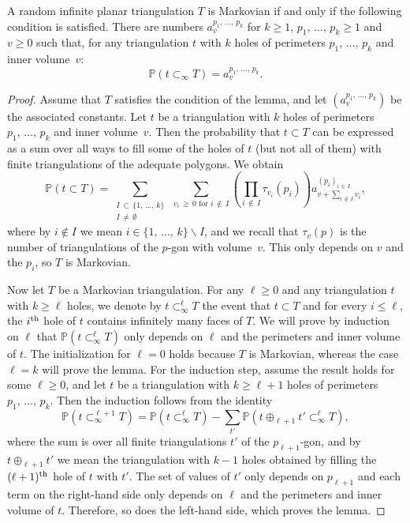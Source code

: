 \documentclass[AHL,Unicode,longabstracts,published]{cedram}
\renewcommand{\P}{\mathbb{P}}
\begin{document}
\begin{lemm}\label{lem_equivalence_weak_Markov}
A random infinite planar triangulation $T$ is Markovian if and only if the following condition is satisfied. There are numbers $a^{p_1,\,\dots,\, p_k}_v$ for $k \geq 1$, $p_1,\,\dots,\,p_k \geq 1$ and $v \geq 0$ such that, for any triangulation $t$ with $k$ holes of perimeters $p_1,\,\dots,\, p_k$ and inner volume~$v$:
\[
\P \left(t \subset_{\infty} T \right) = a^{p_1,\, \dots,\,p_k}_v.
\]
\end{lemm}

\begin{proof}
Assume that $T$ satisfies the condition of the lemma, and let $(a^{p_1,\,\dots,\, p_k}_v )$ be the associated constants. Let $t$ be a triangulation with $k$ holes of perimeters $p_1,\, \dots,\, p_k$ and inner volume~$v$. Then the probability that $t \subset T$ can be expressed as a sum over all ways to fill some of the holes of $t$ (but not all of them) with finite triangulations of the adequate polygons. We obtain
\[
\P \left(t \subset T \right) = \sum_{\substack{I\, \subset\,\{1,\,\dots,\,k\}\\
I\,\ne\,\emptyset}}\: \sum_{v_i\,\geq\,0 \text{ for } i\,\notin\,I} \left(\prod_{i\,\notin\,I} \tau_{v_i}(p_i) \right) a_{v + \sum\limits_{i\,\notin\,I} v_i}^{\left(p_i \right)_{i\,\in\,I}},
\]
where by $i \notin I$ we mean $i \in \{1,\,\dots,\,k\} \backslash I$, and we recall that $\tau_v(p)$ is the number of triangulations of the $p$-gon with volume~$v$. This only depends on $v$ and the $p_i$, so $T$ is Markovian.

Now let $T$ be a Markovian triangulation. For any $\ell \geq 0$ and any triangulation $t$ with $k \geq \ell$ holes, we denote by $t \subset_{\infty}^{\ell} T$ the event that $t \subset T$ and for every $i \leq \ell$, the $i^{\rm th}$ hole of $t$ contains infinitely many faces of $T$. We will prove by induction on $\ell$ that $\P (t \subset_{\infty}^{\ell} T)$ only depends on $\ell$ and the perimeters and inner volume of $t$. The initialization for $\ell=0$ holds because $T$ is Markovian, whereas the case $\ell=k$ will prove the lemma. For the induction step, assume the result holds for some $\ell \geq 0$, and let $t$ be a triangulation with $k \geq \ell+1$ holes of perimeters $p_1,\,\dots,\,p_k$. Then the induction follows from the identity
\[
\P \left(t \subset_{\infty}^{\ell+1} T \right) = \P \left(t \subset_{\infty}^{\ell} T \right) - \sum_{t'} \P \left(t \oplus_{\ell+1} t' \subset_{\infty}^{\ell} T \right),
\]
where the sum is over all finite triangulations $t'$ of the $p_{\ell+1}$-gon, and by $t \oplus_{\ell+1} t'$ we mean the triangulation with $k-1$ holes obtained by filling the $(\ell+1)^{\rm th}$ hole of $t$ with $t'$. The set of values of $t'$ only depends on $p_{\ell+1}$ and each term on the right-hand side only depends on $\ell$ and the perimeters and inner volume of $t$. Therefore, so does the left-hand side, which proves the lemma.
\end{proof}
\end{document}
